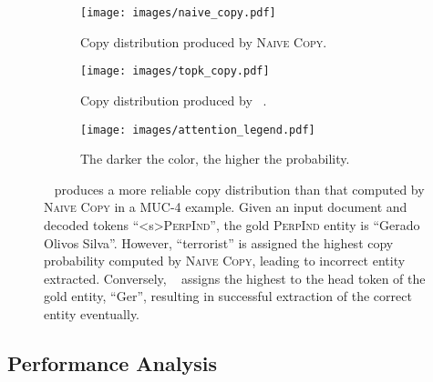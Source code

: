\documentclass[11pt]{article}
\begin{document}
\begin{figure}[t]
    \centering
    \begin{subfigure}{0.48\textwidth}

    \texttt{[image: images/naive\_copy.pdf]}
    \caption{Copy distribution produced by \textsc{Naive Copy}. }
    \end{subfigure}
    \par\bigskip
    \begin{subfigure}[b]{0.48\textwidth}
    \texttt{[image: images/topk\_copy.pdf]}
    \caption{Copy distribution produced by \topkcopy~.}
    \end{subfigure}
    \par\bigskip
    \begin{subfigure}[b]{0.48\textwidth}
    \begin{center}
    \texttt{[image: images/attention\_legend.pdf]}
    \caption{The darker the color, the higher the probability.}
    \end{center}
    \end{subfigure}
    
    \caption{\topkcopy~ produces a more reliable copy distribution  than that computed by \textsc{Naive Copy} in a MUC-4 example. Given an input document and decoded tokens ``<s>\textsc{PerpInd}'', the gold \textsc{PerpInd} entity is ``Gerado Olivos Silva''. However, ``terrorist'' is assigned the highest copy probability computed by \textsc{Naive Copy}, leading to incorrect entity extracted. Conversely, \topkcopy~ assigns the highest  to the head token of the gold entity, ``Ger'', resulting in successful extraction of the correct entity eventually. }
    \label{fig:attention_comparison}
    \vspace{-5mm}
\end{figure}

\subsection{Performance Analysis}
\end{document}
